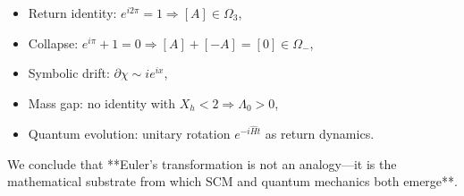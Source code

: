 \begin{itemize}
    \item Return identity: \( e^{i2\pi} = 1 \Rightarrow [A] \in \Omega_3 \),
    \item Collapse: \( e^{i\pi} + 1 = 0 \Rightarrow [A] + [-A] = [0] \in \Omega_- \),
    \item Symbolic drift: \( \partial \chi \sim i e^{ix} \),
    \item Mass gap: no identity with \( X_h < 2 \Rightarrow \Lambda_0 > 0 \),
    \item Quantum evolution: unitary rotation \( e^{-i\hat{H}t} \) as return dynamics.
\end{itemize}

\noindent We conclude that **Euler’s transformation is not an analogy—it is the mathematical substrate from which SCM and quantum mechanics both emerge**.

